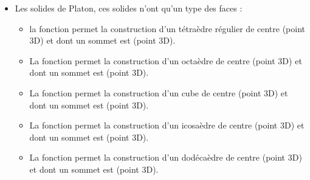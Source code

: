 \begin{itemize}
    \item Les solides de Platon, ces solides n'ont qu'un type des faces :
        \begin{itemize}
            \item  la fonction  permet la construction d'un tétraèdre régulier de centre  (point 3D) et dont un sommet est  (point 3D).
            \item La fonction  permet la construction d'un octaèdre de centre  (point 3D) et dont un sommet est  (point 3D).
            \item La fonction  permet la construction d'un cube de centre  (point 3D) et dont un sommet est  (point 3D).
            \item La fonction  permet la construction d'un icosaèdre de centre  (point 3D) et dont un sommet est  (point 3D).
            \item La fonction  permet la construction d'un dodécaèdre de centre  (point 3D) et dont un sommet est  (point 3D).
        \end{itemize}


\end{itemize}
